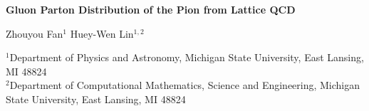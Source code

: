 \documentclass[11pt]{article}
\begin{document}
\begin{center}
  {\LARGE\bfseries Gluon Parton Distribution of the Pion from Lattice QCD\footnotemark[1]\par}
  \vspace{1.2em}
  {\large Zhouyou Fan$^{1}$ \quad Huey-Wen Lin$^{1,2}$\par}
  \vspace{0.9em}
  {\small
   $^{1}$Department of Physics and Astronomy, Michigan State University, East Lansing, MI 48824\\
   $^{2}$Department of Computational Mathematics, Science and Engineering, Michigan State University, East Lansing, MI 48824\par}
\end{center}

\vspace{0.5em}

\begin{abstract}
We present the first determination of the $x$-dependent pion gluon distribution from lattice QCD using the pseudo-PDF approach.
We use lattice ensembles with 2+1+1 flavors of highly improved staggered quarks (HISQ), generated by MILC Collaboration, at two lattice spacings $a\approx 0.12$ and 0.15~fm and three pion masses $M_\pi\approx 220$, 310 and 690~MeV.
We use clover fermions for the valence action and momentum smearing to achieve pion boost momentum up to 2.29~GeV.
We find that the dependence of the pion gluon parton distribution on lattice spacing and pion mass is mild.
We compare our results from the lightest pion mass ensemble with the determination by JAM and xFitter global fits.
\end{abstract}






\end{document}
